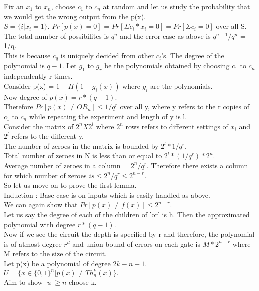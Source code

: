 \documentclass[solution,addpoints,12pt]{exam}
\begin{document}
Fix an $x_1$ to $x_n$, choose $c_1$ to $c_n$ at random and let us study the
probability that we would get the wrong output from the p(x).\\
$S = \{i | x_i = 1\}$.
$Pr[p(x) = 0]$ = $Pr[\Sigma c_i*x_i = 0] = Pr[\Sigma c_i = 0]$ over all S.\\
The total number of possibilites is $q^n$ and the error case as above is $q^{n-1}/q^n$ = 1/q.\\
This is because $c_q$ is uniquely decided from other $c_i$'s. The degree of the
polynomial is $q-1$. Let $g_1$ to $g_r$ be the polynomials obtained by
choosing $c_1$ to $c_n$ independently r times.\\
Consider p(x) = $1 - \Pi(1-g_i (x))$ where $g_i$ are the polynomials.\\
Now degree of $p(x) = r*(q-1)$.\\
Therefore $Pr[p(x) \ne OR_n] \le 1/q^r$ over all y, where y refers
to the r copies of $c_1$ to $c_n$ while repeating the experiment
and length of y is l.\\
Consider the matrix of $2^nX2^l$ where $2^n$ rows refers to different settings
of $x_i$ and $2^l$ refers to the different y.\\
The number of zeroes in the matrix is bounded by $2^l*1/q^r$.\\
Total number of zeroes in N is less than or equal to $2^l*(1/q^r)*2^n$.\\
Average number of zeroes in a column = $2^n/q^r$. Therefore
there exists a column for which number of zeroes $is \le 2^n/q^r \le 2^{n-r}$.\\

So let us move on to prove the first lemma.\\
Induction : Base case is on inputs which is easily handled as above.\\
We can again show that $Pr[p(x) \ne f(x)] \le 2^{n-r}$.\\
Let us say the degree of each of the children of 'or' is h. Then the
approximated polynomial with degree $r*(q-1)$.\\
Now if we see the circuit the depth is specified by r and therefore, the
polynomial is of atmost degree $r^d$ and union bound of errors on
each gate is $M*2^{n-r}$ where M refers to the size of the circuit.\\

Let p(x) be a polynomial of degree $2k - n + 1$.\\
$U = \{ x \in {\{0, 1\}}^n | p(x) \ne Th_{n}^{k}(x)\}.$\\
Aim to show $|u| \ge n$ choose k.\\
\end{document}
